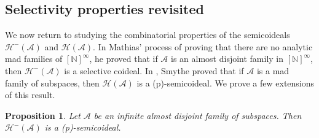\documentclass[10pt,a4paper]{amsart}
\theoremstyle{plain}
\numberwithin{equation}{section}
\newtheorem{proposition}[theorem]{Proposition}
\theoremstyle{definition}
\newcommand{\N}{\mathbb{N}}
\newcommand{\cal}{\mathcal}
\newcommand{\A}{\cal{A}}
\renewcommand{\H}{\cal{H}}
\begin{document}
\subsection{Selectivity properties revisited}
We now return to studying the combinatorial properties of the semicoideals $\H^-(\A)$ and $\H(\A)$. In Mathias' process of proving that there are no analytic mad families of $[\N]^\infty$, he proved that if $\A$ is an almost disjoint family in $[\N]^\infty$, then $\H^-(\A)$ is a selective coideal. In \cite{S19}, Smythe proved that if $\A$ is a mad family of subspaces, then $\H(\A)$ is a (p)-semicoideal. We prove a few extensions of this result. 

\begin{proposition}
\label{prop:H^-(A).is.(p)}
    Let $\A$ be an infinite almost disjoint family of subspaces. Then $\H^-(\A)$ is a (p)-semicoideal.
\end{proposition}
\end{document}
